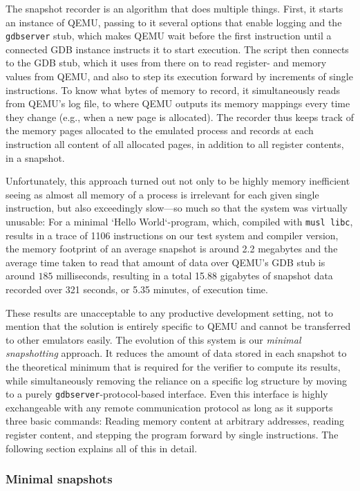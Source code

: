 The snapshot recorder is an algorithm that does multiple things. First, it starts an instance of QEMU, passing to it
several options that enable logging and the \texttt{gdbserver} stub, which makes QEMU wait before the first instruction
until a connected GDB instance instructs it to start execution. The script then connects to the GDB stub, which it uses
from there on to read register- and memory values from QEMU, and also to step its execution forward by increments of
single instructions. To know what bytes of memory to record, it simultaneously reads from QEMU's log file, to where QEMU
outputs its memory mappings every time they change (e.g., when a new page is allocated). The recorder thus keeps track
of the memory pages allocated to the emulated process and records at each instruction all content of all allocated
pages, in addition to all register contents, in a snapshot.

Unfortunately, this approach turned out not only to be highly memory inefficient seeing as almost all memory of a
process is irrelevant for each given single instruction, but also exceedingly slow---so much so that the system was
virtually unusable: For a minimal `Hello World`-program, which, compiled with \texttt{musl libc}, results in a trace of
1106 instructions on our test system and compiler version, the memory footprint of an average snapshot is around 2.2
megabytes and the average time taken to read that amount of data over QEMU's GDB stub is around $185$ milliseconds,
resulting in a total 15.88 gigabytes of snapshot data recorded over 321 seconds, or 5.35 minutes, of execution time.

These results are unacceptable to any productive development setting, not to mention that the solution is entirely
specific to QEMU and cannot be transferred to other emulators easily. The evolution of this system is our
\textit{minimal snapshotting} approach. It reduces the amount of data stored in each snapshot to the theoretical minimum
that is required for the verifier to compute its results, while simultaneously removing the reliance on a specific log
structure by moving to a purely \texttt{gdbserver}-protocol-based interface. Even this interface is highly exchangeable
with any remote communication protocol as long as it supports three basic commands: Reading memory content at arbitrary
addresses, reading register content, and stepping the program forward by single instructions. The following section
explains all of this in detail.

\subsubsection{Minimal snapshots}\label{sec:minimal_snapshots}

